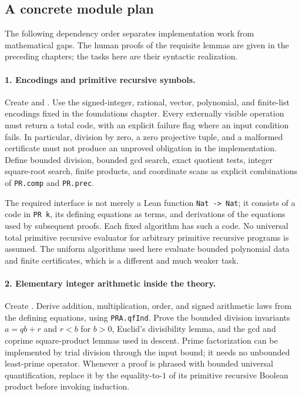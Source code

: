 \subsection{A concrete module plan}

The following dependency order separates implementation work from
mathematical gaps.  The human proofs of the requisite lemmas are given in
the preceding chapters; the tasks here are their syntactic realization.

\paragraph{1. Encodings and primitive recursive symbols.}
Create  and .
Use the signed-integer, rational, vector, polynomial, and finite-list
encodings fixed in the foundations chapter.  Every externally visible
operation must return a total code, with an explicit failure flag where
an input condition fails.  In particular, division by zero, a zero
projective tuple, and a malformed certificate must not produce an
unproved obligation in the implementation.  Define bounded division,
bounded gcd search, exact quotient tests, integer square-root search,
finite products, and coordinate scans as explicit combinations of
\texttt{PR.comp} and \texttt{PR.prec}.

The required interface is not merely a Lean function
\texttt{Nat -> Nat}; it consists of a code in \texttt{PR k}, its defining
equations as terms, and derivations of the equations used by subsequent
proofs.  Each fixed algorithm has such a code.  No universal total
primitive recursive evaluator for arbitrary primitive recursive programs
is assumed.  The uniform algorithms used here evaluate bounded polynomial
data and finite certificates, which is a different and much weaker task.

\paragraph{2. Elementary integer arithmetic inside the theory.}
Create .  Derive addition, multiplication,
order, and signed arithmetic laws from the defining equations, using
\texttt{PRA.qfInd}.  Prove the bounded division invariants
$a=qb+r$ and $r<b$ for $b>0$, Euclid's divisibility lemma, and the gcd and
coprime square-product lemmas used in descent.  Prime factorization can
be implemented by trial division through the input bound; it needs no
unbounded least-prime operator.  Whenever a proof is phrased with bounded
universal quantification, replace it by the equality-to-$1$ of its
primitive recursive Boolean product before invoking induction.

